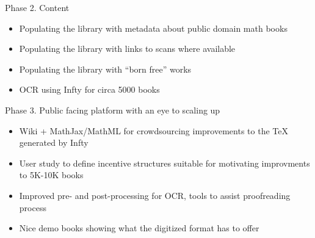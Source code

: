 \documentclass{article}
\begin{document}
\begin{landscape}
{{\begin{flushright}
\begin{minipage}[t]{.65\textwidth}
{Phase 2. Content
\begin{itemize}
\item  Populating the library with metadata about public domain math books
\item  Populating the library with links to scans where available
\item  Populating the library with ``born free'' works
\item  OCR using Infty for circa 5000 books
\end{itemize}
Phase 3. Public facing platform with an eye to scaling up 
\begin{itemize}
\item Wiki + MathJax/MathML for crowdsourcing improvements to the TeX generated by Infty
\item User study to define incentive structures suitable for motivating improvments to 5K-10K books
\item Improved pre- and post-processing for OCR, tools to assist proofreading process
\item Nice demo books showing what the digitized format has to offer
\end{itemize}
}
\end{minipage}
\end{flushright}
}
}
\end{landscape}
\end{document}
